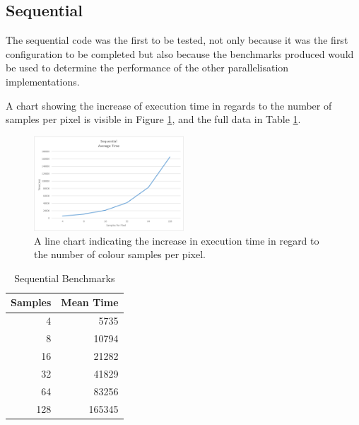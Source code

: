 \documentclass[journal,transmag]{IEEEtran}
\begin{document}
	\subsection{Sequential}
		The sequential code was the first to be tested, not only because it was the first configuration to be completed but also because the benchmarks produced would be used to determine the performance of the other parallelisation implementations.
		
		A chart showing the increase of execution time in regards to the number of samples per pixel is visible in Figure \ref{fig_seq_time}, and the full data in Table \ref{table_seq_data}.
		
		\begin{figure}[h]
			\centering
			\includegraphics[width = 0.5\textwidth]{chartSeqTime}
			\caption{A line chart indicating the increase in execution time in regard to the number of colour samples per pixel.}
			\label{fig_seq_time}
		\end{figure}
	
		\begin{table}[h]
		\centering
		\caption{Sequential Benchmarks}
		\label{table_seq_data}
		\begin{tabular}{|r|r|}
			\hline
			\multicolumn{1}{|l|}{Samples} & \multicolumn{1}{l|}{Mean Time} \\ \hline
			4                             & 5735                           \\ \hline
			8                             & 10794                          \\ \hline
			16                            & 21282                          \\ \hline
			32                            & 41829                          \\ \hline
			64                            & 83256                          \\ \hline
			128                           & 165345                         \\ \hline
		\end{tabular}
	\end{table}
	
\end{document}
